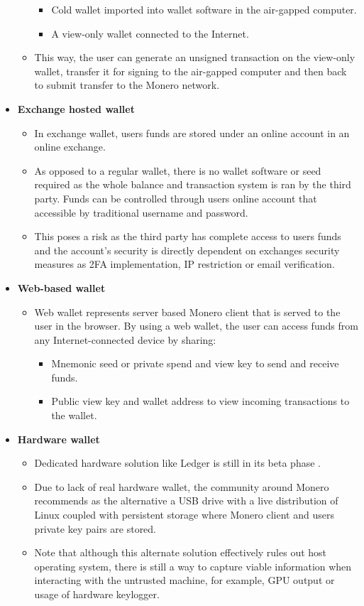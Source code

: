 \documentclass[
  printed, %
  table,   %
  lof,     %
  lot,     %
           oneside, color
]{fithesis3}
\begin{document}
\begin{itemize}
\begin{itemize}
\begin{itemize}
\item Cold wallet imported into wallet software in the air-gapped computer.
\item A view-only wallet connected to the Internet. 
\end{itemize}
\item This way, the user can generate an unsigned transaction on the view-only wallet, transfer it for signing to the air-gapped computer and then back to submit transfer to the Monero network.
\end{itemize}
\item \textbf{Exchange hosted wallet}
\begin{itemize}\itemsep0em
\item In exchange wallet, users funds are stored under an online account in an online exchange. 
\item As opposed to a regular wallet, there is no wallet software or seed required as the whole balance and transaction system is ran by the third party.
Funds can be controlled through users online account that accessible by traditional username and password. 
\item This poses a risk as the third party has complete access to users funds and the account's security is directly dependent on exchanges security measures as 2FA implementation, IP restriction or email verification.
\end{itemize}
\item \textbf{Web-based wallet}
\begin{itemize}\itemsep0em
\item Web wallet represents server based Monero client that is served to the user in the browser. By using a web wallet, the user can access funds from any Internet-connected device by sharing:
\begin{itemize}\itemsep0em
\item Mnemonic seed or private spend and view key to send and receive funds.
\item Public view key and wallet address to view incoming transactions to the wallet.
\end{itemize}
\end{itemize}
\item \textbf{Hardware wallet}
\begin{itemize}\itemsep0em
\item Dedicated hardware solution like Ledger is still in its beta phase \cite{ledgermonero}.
\item Due to lack of real hardware wallet, the community around Monero recommends as the alternative a USB drive with a live distribution of Linux coupled with persistent storage where Monero client and users private key pairs are stored. 
\item Note that although this alternate solution effectively rules out host operating system, there is still a way to capture viable information when interacting with the untrusted machine, for example, GPU output or usage of hardware keylogger.

\end{itemize}
\end{itemize} 
\end{document}
